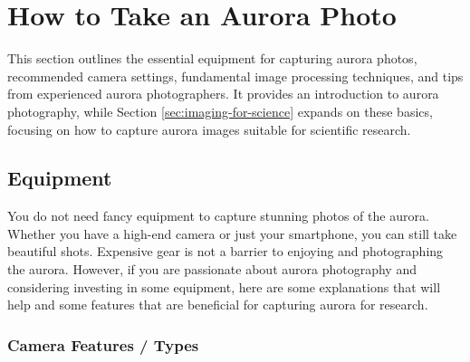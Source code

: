 \documentclass{article}
\newcommand{\contributed}[1]{%
    \par\noindent
    \begingroup
    \setlength{\leftskip}{1em}%
    \itshape
    Contributors: #1
    \par
    \endgroup
    \vspace{0.5em}
}
\begin{document}
\section{How to Take an Aurora Photo} 
This section outlines the essential equipment for capturing aurora photos, recommended camera settings, fundamental image processing techniques, and tips from experienced aurora photographers. It provides an introduction to aurora photography, while Section \ref{sec:imaging-for-science} expands on these basics, focusing on how to capture aurora images suitable for scientific research.


\subsection{Equipment}

You do not need fancy equipment to capture stunning photos of the aurora. Whether you have a high-end camera or just your smartphone, you can still take beautiful shots. Expensive gear is not a barrier to enjoying and photographing the aurora. However, if you are passionate about aurora photography and considering investing in some equipment, here are some explanations that will help and some features that are beneficial for capturing aurora for research.

\subsubsection{Camera Features / Types}
\end{document}
